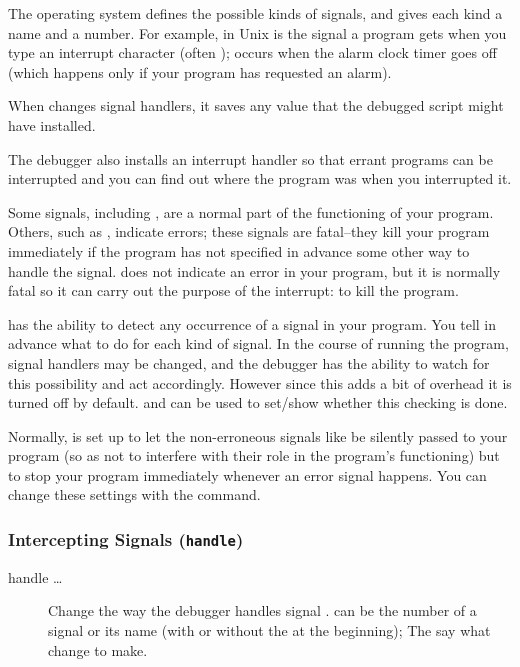 The operating system defines the possible kinds of signals, and gives
each kind a name and a number.  For example, in Unix  is
the signal a program gets when you type an interrupt character (often
);  occurs when the alarm clock timer goes off
(which happens only if your program has requested an alarm).

When  changes signal handlers, it saves any value that the
debugged script might have installed. 

The debugger also installs an interrupt handler  so that
errant programs can be interrupted and you can find out where the
program was when you interrupted it.

Some signals, including , are a normal part of the
functioning of your program.  Others, such as , indicate
errors; these signals are fatal--they kill your program immediately if the
program has not specified in advance some other way to handle the signal.
 does not indicate an error in your program, but it is normally
fatal so it can carry out the purpose of the interrupt: to kill the program.

 has the ability to detect any occurrence of a signal in
your program.  You tell  in advance what to do for each
kind of signal.  In the course of running the program, signal handlers
may be changed, and the debugger has the ability to watch for this
possibility and act accordingly. However since this adds a bit of
overhead it is turned off by default.  and
 can be used to set/show whether this checking is
done.

Normally,  is set up to let the non-erroneous signals like
 be silently passed to your program (so as not to
interfere with their role in the program's functioning) but to stop
your program immediately whenever an error signal happens.  You can
change these settings with the  command.

\subsubsection{Intercepting Signals ({\tt handle})}\label{subsubsection-handle}

\begin{description}
\item[handle  \ldots]
Change the way the debugger handles signal .  
can be the number of a signal or its name (with or without the
 at the beginning); The  say what change to
make.
\end{description}

